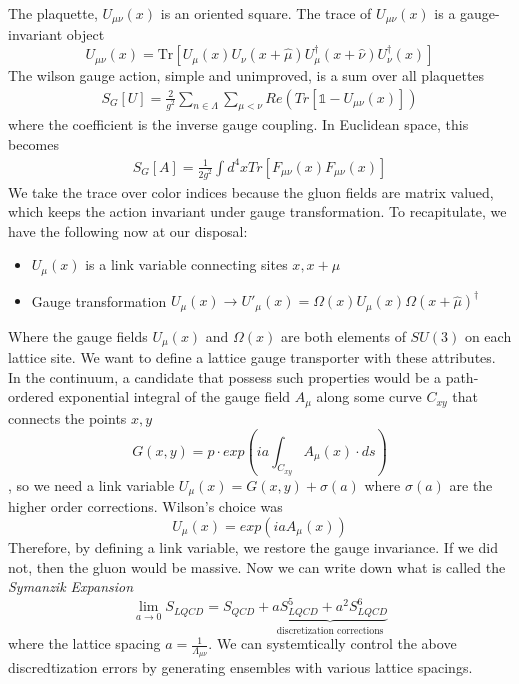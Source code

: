     
The plaquette, $U_{\mu\nu}(x)$ is an oriented square. The trace of  $U_{\mu\nu}(x)$ is a gauge-invariant object  
\begin{equation}
    U_{\mu\nu}(x) = \text{Tr} \left[ U_\mu(x) U_\nu(x + \hat{\mu}) U_\mu^\dagger(x + \hat{\nu}) U_\nu^\dagger(x) \right]
\end{equation}
The wilson gauge action, simple and unimproved, is a sum over all plaquettes
\begin{align}
    S_G[U] = \frac{2}{g^2} \sum_{n\in\Lambda}^{}\sum_{\mu < \nu}^{} Re\left(Tr\left[\mathbb{1} - U_{\mu\nu}(x)\right]\right)
\end{align}
where the coefficient is the inverse gauge coupling. 
In Euclidean space, this becomes 
\begin{align}
    S_G[A] = \frac{1}{2g^2} \int d^4x Tr\left[F_{\mu\nu}(x) F_{\mu\nu}(x)\right]
\end{align}
We take the trace over color indices because the gluon fields are matrix valued, which keeps the action invariant under gauge transformation. To recapitulate, we have the following now at our disposal:
\begin{itemize}
    \item $U_\mu(x)$ is a link variable connecting sites $x, x+\mu$ 
    \item Gauge transformation $U_\mu(x) \to U'_\mu(x) = \Omega(x)U_\mu(x)\Omega(x+\hat{\mu})^\dagger$
\end{itemize}
Where the gauge fields $U_\mu(x)$ and $\Omega(x)$ are both elements of $SU(3)$ on each lattice site. 
We want to define a lattice gauge transporter with these attributes. In the continuum, a candidate that possess such properties would be a path-ordered exponential integral of the gauge field $A_\mu$ along some curve $C_{xy}$ that connects the points $x,y$ 
\begin{equation}
    G(x,y) = p\cdot exp\left(ia\int_{C_{xy}}^{}A_\mu(x) \cdot ds\right)
\end{equation},
so we need a link variable $U_\mu(x) = G(x,y) + \sigma(a)$ where $\sigma(a)$ are the higher order corrections. Wilson's choice was 
\begin{equation}
    U_\mu(x) = exp\left(iaA_\mu(x)\right)
\end{equation}
Therefore, by defining a link variable, we restore the gauge invariance. If we did not, then the gluon would be massive. Now we can write down what is called the \textit{Symanzik Expansion} 
\begin{equation}
    \lim\limits_{a \to 0} S_{LQCD} = S_{QCD} + \underbrace{aS_{LQCD}^5 + a^2 S^6_{LQCD}}_{\text{discretization corrections}}
\end{equation} where the lattice spacing $a = \frac{1}{\Lambda_{\mu\nu}}$. We can systemtically control the above discredtization errors by generating ensembles with various lattice spacings. 


